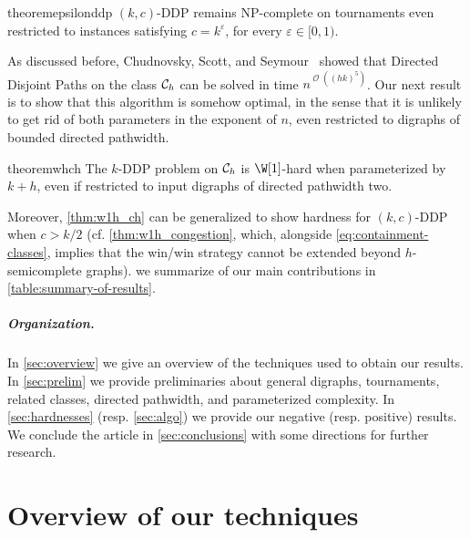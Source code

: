 \documentclass[a4paper,UKenglish,cleveref, autoref, thm-restate]{lipics-v2021}
\DeclareMathOperator{\Ocal}{\mathcal{O}\xspace}
\renewcommand{\NP}{{\sf NP}\xspace}
\newcommand{\pname}[1]{{\sc #1}}
\begin{document}
\begin{restatable}{theorem}{epsilonddp}\label{thm:epsilon_ddp}
     \pname{$(k,c)$-DDP} remains \NP-complete on tournaments even restricted to instances satisfying $c = k^{\varepsilon}$, for every $\varepsilon \in [0,1)$.
\end{restatable}


As discussed before, Chudnovsky, Scott, and
Seymour~\cite{chudnovsky_union_of_tournaments} showed that {\sc Directed Disjoint
Paths} on the class ${\cal C}_h$ can be solved in time  $n^{\Ocal((hk)^5)}$. Our next
result is to show that this algorithm is somehow optimal, in the sense that it is
unlikely to get rid of both parameters in the exponent of $n$, even restricted to
digraphs of bounded directed pathwidth.

\begin{restatable}{theorem}{whch}\label{thm:w1h_ch}
     The \pname{$k$-DDP} problem on ${\cal C}_h$ is $\W[1]$-hard when parameterized by $k+h$, even if restricted to input digraphs of directed pathwidth two.
\end{restatable}

Moreover, \autoref{thm:w1h_ch} can be generalized to show hardness for \pname{$(k,c)$-DDP} when $c > k/2$ (cf. \autoref{thm:w1h_congestion}, which, alongside \autoref{eq:containment-classes}, implies that the win/win strategy cannot be extended beyond $h$-semicomplete graphs).
we summarize of our main contributions in \autoref{table:summary-of-results}.












 \subparagraph*{Organization.} 
    In \autoref{sec:overview} we give an overview of the techniques used to obtain our results.
  In \autoref{sec:prelim} we provide preliminaries about general digraphs,
  tournaments, related classes, directed pathwidth, and parameterized complexity. 
  In \autoref{sec:hardnesses} (resp. \autoref{sec:algo}) we provide our negative (resp. positive) results. We conclude the article in \autoref{sec:conclusions} with some directions for further research.
  





\section{Overview of our techniques}
\label{sec:overview}
\end{document}
